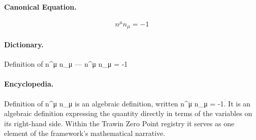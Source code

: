 \paragraph{Canonical Equation.}
\[
n^\mu n_\mu = -1
\]

\paragraph{Dictionary.}
Definition of n\textasciicircum{}μ n\_μ — n\textasciicircum{}μ n\_μ = -1

\paragraph{Encyclopedia.}
Definition of n\textasciicircum{}μ n\_μ is an algebraic definition, written n\textasciicircum{}μ n\_μ = -1. It is an algebraic definition expressing the quantity directly in terms of the variables on its right-hand side. Within the Trawin Zero Point registry it serves as one element of the framework's mathematical narrative.
